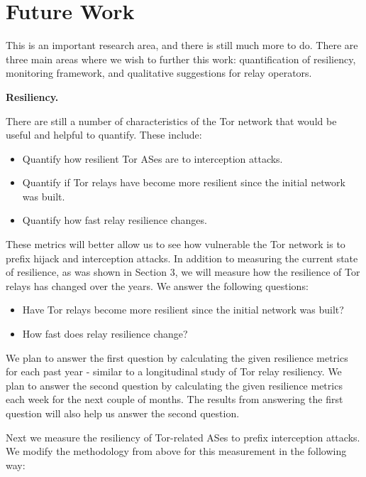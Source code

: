 \section{Future Work}

This is an important research area, and there is still much more to do.  There are three main areas where we wish to further this work: quantification of resiliency, monitoring framework, and qualitative suggestions for relay operators.

{\bf Resiliency.}  

There are still a number of characteristics of the Tor network that would be useful and helpful to quantify.  These include:

\begin{itemize}
\item Quantify how resilient Tor ASes are to interception attacks.
\item Quantify if Tor relays have become more resilient since the initial network was built.
\item Quantify how fast relay resilience changes.
\end{itemize}

These metrics will better allow us to see how vulnerable the Tor network is to prefix hijack and interception attacks.  In addition to measuring the current state of resilience, as was shown in Section 3, we will measure how the resilience of Tor relays has changed over the years.  We answer the following questions:

\begin{itemize}
\item Have Tor relays become more resilient since the initial network was built?
\item How fast does relay resilience change? 
\end{itemize}

We plan to answer the first question by calculating the given resilience metrics for each past year - similar to a longitudinal study of Tor relay resiliency.  We plan to answer the second question by calculating the given resilience metrics each week for the next couple of months.  The results from answering the first question will also help us answer the second question.

Next we measure the resiliency of Tor-related ASes to prefix interception attacks.  We modify the methodology from above for this measurement in the following way:


